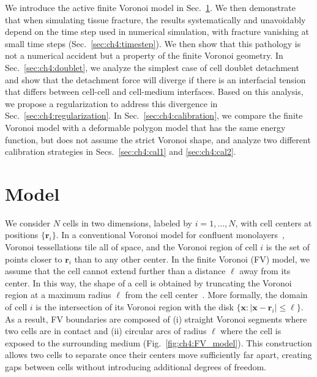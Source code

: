 We introduce the active finite Voronoi model in Sec.~\ref{sec:ch4:model}. We then demonstrate that when simulating tissue fracture, the results systematically and unavoidably depend on the time step used in numerical simulation, with fracture vanishing at small time steps (Sec.~\ref{sec:ch4:timestep}).
We then show that this pathology is not a numerical accident but a property of the finite Voronoi geometry. In Sec.~\ref{sec:ch4:doublet}, we analyze the simplest case of cell doublet detachment and show that the detachment force will diverge if there is an interfacial tension that differs between cell-cell and cell-medium interfaces.
Based on this analysis, we propose a regularization to address this divergence in Sec.~\ref{sec:ch4:regularization}.
In Sec.~\ref{sec:ch4:calibration}, we compare the finite Voronoi model with a deformable polygon model that has the same energy function, but does not assume the strict Voronoi shape, and analyze two different calibration strategies in Secs.~\ref{sec:ch4:cal1} and \ref{sec:ch4:cal2}.


\section{Model}
\label{sec:ch4:model}

We consider $N$ cells in two dimensions, labeled by $i=1,\dots,N$, with cell centers at positions $\{\mathbf r_i\}$.
In a conventional Voronoi model for confluent monolayers~\cite{bi2016motility}, Voronoi tessellations tile all of space, and the Voronoi region of cell $i$ is the set of points closer to $\mathbf{r}_i$ than to any other center.
In the finite Voronoi (FV) model, we assume that the cell cannot extend further than a distance $\ell$ away from its center. In this way, the shape of a cell is obtained by truncating the Voronoi region at a maximum radius $\ell$ from the cell center~\cite{teomy2018confluent,huang2023bridging}.
More formally, the domain of cell $i$ is the intersection of its Voronoi region with the disk $\{\mathbf x:|\mathbf x-\mathbf r_i|\leqslant \ell\}$.
As a result, FV boundaries are composed of (i) straight Voronoi segments where two cells are in contact and (ii) circular arcs of radius $\ell$ where the cell is exposed to the surrounding medium (Fig.~\ref{fig:ch4:FV_model}).
This construction allows two cells to separate once their centers move sufficiently far apart, creating gaps between cells without introducing additional degrees of freedom.

